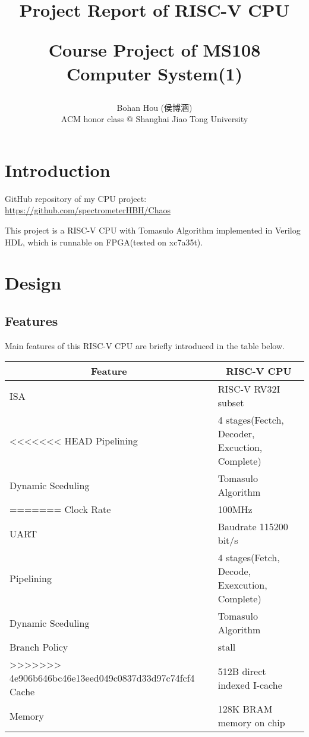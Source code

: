 \documentclass[12pt, a4paper]{article}
\title{Project Report of RISC-V CPU\\\begin{large}Course Project of MS108 Computer System(1)\end{large}}
\author{Bohan Hou (侯博涵)\\ACM honor class @ Shanghai Jiao Tong University}
\date{}
\theoremstyle{margin}
\begin{document}
\maketitle

\section{Introduction}

GitHub repository of my CPU project: \url{https://github.com/spectrometerHBH/Chaos}

This project is a RISC-V CPU with Tomasulo Algorithm implemented in Verilog HDL, which is runnable on FPGA(tested on xc7a35t).

\section{Design}

\subsection{Features}

Main features of this RISC-V CPU are briefly introduced in the table below.

\begin{table}[H]
\centering
\begin{tabular}{@{}ll@{}}
\toprule
\multicolumn{1}{c}{Feature} & \multicolumn{1}{c}{RISC-V CPU}                                                                        \\ \midrule
ISA                         & RISC-V RV32I subset\\
<<<<<<< HEAD
Pipelining                  & 4 stages(Fectch, Decoder, Excuction, Complete) \\
Dynamic Sceduling           & Tomasulo Algorithm \\
=======
Clock Rate                  & 100MHz \\
UART                        & Baudrate 115200 bit/s \\
Pipelining                  & 4 stages(Fetch, Decode, Exexcution, Complete) \\
Dynamic Sceduling           & Tomasulo Algorithm \\
Branch Policy               & stall \\
>>>>>>> 4e906b646bc46e13eed049c0837d33d97c74fcf4
Cache                       & 512B direct indexed I-cache\\
Memory                      & 128K BRAM memory on chip \\ 
\bottomrule
\end{tabular}
\end{table}
\end{document}
